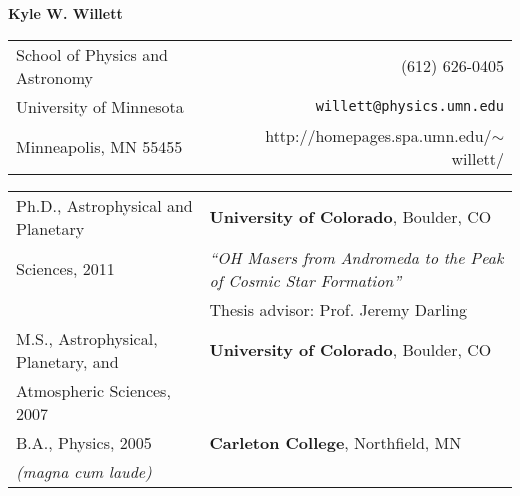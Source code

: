 
\marginparwidth 90pt


\marginparsep 11pt
\topmargin -27pt \headsep 25pt \footheight 12pt
\textheight 9.0in  
\oddsidemargin 0pt
\raggedright\raggedbottom
{}

\textwidth6.5in


\pagestyle{fancy}
\fancyhead[L]{}
\fancyhead[R]{}
\renewcommand{\headrulewidth}{1pt} %
\parindent0pt

\begin{center}
{\LARGE\bf Kyle W. Willett}\\
\medskip\medskip
\begin{tabular}{lcr}
School of Physics and Astronomy  &  \hspace{70pt} &  (612) 626-0405 \\
University of Minnesota       &  \hspace{70pt} &  {\tt willett@physics.umn.edu}       \\
Minneapolis, MN 55455     &  \hspace{70pt} &  http://homepages.spa.umn.edu/$\sim$willett/ \\
\end{tabular}
\end{center}

\medskip
{}
\vskip4pt
\medskip

\begin{tabular}{@{}p{3.3in}p{2.8in}}
{\large \sc Ph.D., Astrophysical and Planetary}     & {\large\bf University of Colorado}, Boulder, CO \\
{\large \sc Sciences, 2011}                         & {\it ``OH Masers from Andromeda to the Peak of Cosmic Star Formation''} \\[4pt]
                                          & Thesis advisor: Prof. Jeremy Darling\\[4pt]
{\large \sc M.S., Astrophysical, Planetary, and }     & {\large\bf University of Colorado}, Boulder, CO\\
{\large \sc Atmospheric Sciences, 2007}   &                                                \\[4pt]
{\large \sc B.A., Physics, 2005}          & {\large\bf Carleton College}, Northfield, MN\\  
{\small {\it (magna cum laude)}}          & \\
\end{tabular}

